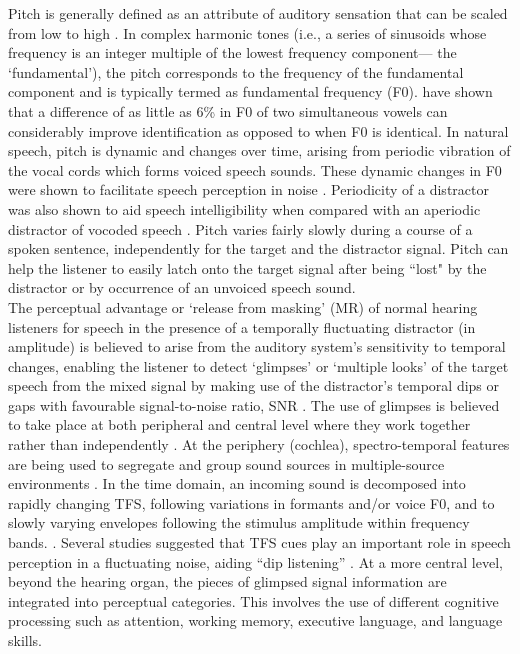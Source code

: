 \documentclass[a4paper, twoside]{templates/ociamthesis}
\begin{document}
Pitch is generally defined as an attribute of auditory sensation that can be scaled from low to high \autocite{Moore2012}. In complex harmonic tones (i.e., a series of sinusoids whose frequency is an integer multiple of the lowest frequency component--- the `fundamental'), the pitch corresponds to the frequency of the fundamental component and is typically termed as fundamental frequency (F0). \textcite{Brokx1982} have shown that a difference of as little as 6\% in F0 of two simultaneous vowels can considerably improve identification as opposed to when F0 is identical. In natural speech, pitch is dynamic and changes over time, arising from periodic vibration of the vocal cords which forms voiced speech sounds. These dynamic changes in F0 were shown to facilitate speech perception in noise \autocite{Laures1999,Binns2007,Miller2010}. Periodicity of a distractor was also shown to aid speech intelligibility when compared with an aperiodic distractor of vocoded speech \autocite{Steinmetzger2015}. Pitch varies fairly slowly during a course of a spoken sentence, independently for the target and the distractor signal. Pitch can help the listener to easily latch onto the target signal after being ``lost" by the distractor or by occurrence of an unvoiced speech sound.\\

The perceptual advantage or `release from masking' (MR) of normal hearing listeners for speech in the presence of a temporally fluctuating distractor (in amplitude) is believed to arise from the auditory system's sensitivity to temporal changes, enabling the listener to detect `glimpses' or `multiple looks' of the target speech from the mixed signal by making use of the distractor's temporal dips or gaps with favourable signal-to-noise ratio, SNR \autocite{Miller1950,Howard-Jones1993,Cooke2006,Moore2008,Stuart2008,Shafiro2011,Shafiro2015}. The use of glimpses is believed to take place at both peripheral and central level where they work together rather than independently \autocite{Moore2003,Cooke2006}. At the periphery (cochlea), spectro-temporal features are being used to segregate and group sound sources in multiple-source environments \autocite[cf.~ASA model by][]{Bergman1990}. In the time domain, an incoming sound is decomposed into rapidly changing TFS, following variations in formants and/or voice F0, and to slowly varying envelopes following the stimulus amplitude within frequency bands. \autocite{Pichora-Fuller2003,Moore2012}. Several studies suggested that TFS cues play an important role in speech perception in a fluctuating noise, aiding ``dip listening'' \autocite{Moore2008,Hopkins2010}. At a more central level, beyond the hearing organ, the pieces of glimpsed signal information are integrated into perceptual categories. This involves the use of different cognitive processing such as attention, working memory, executive language, and language skills.\\
\end{document}

